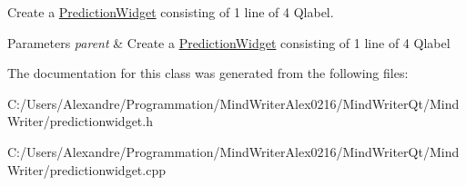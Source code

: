 Create a \hyperlink{class_prediction_widget}{Prediction\-Widget} consisting of 1 line of 4 Qlabel. 


\begin{DoxyParams}{Parameters}
{\em parent} & Create a \hyperlink{class_prediction_widget}{Prediction\-Widget} consisting of 1 line of 4 Qlabel \\
\hline
\end{DoxyParams}


The documentation for this class was generated from the following files\-:\begin{DoxyCompactItemize}
\item 
C\-:/\-Users/\-Alexandre/\-Programmation/\-Mind\-Writer\-Alex0216/\-Mind\-Writer\-Qt/\-Mind\-Writer/predictionwidget.\-h\item 
C\-:/\-Users/\-Alexandre/\-Programmation/\-Mind\-Writer\-Alex0216/\-Mind\-Writer\-Qt/\-Mind\-Writer/predictionwidget.\-cpp\end{DoxyCompactItemize}
